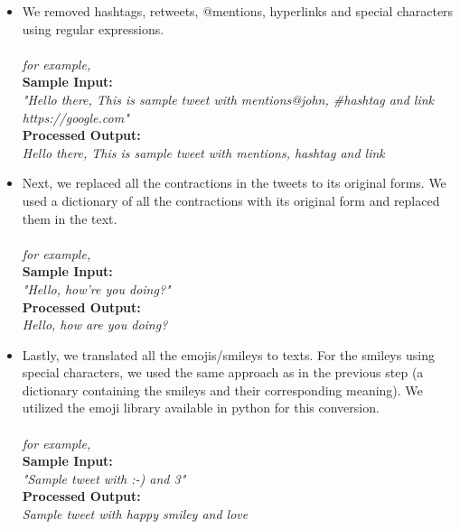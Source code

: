 \documentclass[a4paper,10pt]{article}
\begin{document}
    \begin{itemize}
        \item{
            We removed hashtags, retweets, @mentions, hyperlinks and special characters using regular expressions.
            \\ \\
            \textit{for example, \\  }
            {\textbf{Sample Input: \\} \textit{ "Hello there, This is sample tweet with mentions@john, \#hashtag and link https://google.com"} \\ }
            {\textbf{Processed Output: \\}\textit{  Hello there, This is sample tweet with mentions, hashtag and link \\ } }
        }
        \item{
            Next, we replaced all the contractions in the tweets to its original forms. We used a dictionary of all the contractions with its original form and replaced them in the text.
            \\ \\
            \textit{for example, \\  }
            {\textbf{Sample Input: \\} \textit{"Hello, how're you doing?"} \\ }
            {\textbf{Processed Output: \\}\textit{   Hello, how are you doing? \\ } }
        }
        \item{
            Lastly, we translated all the emojis/smileys to texts. For the smileys using special characters, we used the same approach as in the previous step (a dictionary containing the smileys and their corresponding meaning). We utilized the emoji library available in python for this conversion.
            \\ \\
            \textit{for example, \\  }
            {\textbf{Sample Input: \\} \textit{ "Sample tweet with :-) and 3" } \\ }
            {\textbf{Processed Output: \\}\textit{   Sample tweet with happy smiley and love \\} }
        }\end{itemize}
\end{document}

